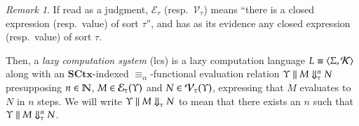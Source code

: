 \documentclass[11pt]{article}
\theoremstyle{definition}
\theoremstyle{remark}
\newtheorem{remark}[thm]{Remark}
\numberwithin{equation}{section}
\def\IModeColorName{MidnightBlue}
\def\OModeColorName{Maroon}
\def\IModeColorName{Black}
\def\OModeColorName{Black}
\newcommand\IMode[1]{{\color{\IModeColorName}{#1}}}
\newcommand\OMode[1]{{\color{\OModeColorName}{#1}}}
\newcommand\Member[2]{\IMode{#1}\in\IMode{#2}}
\newcommand\Match[2]{\IMode{#1}\equiv\OMode{#2}}
\newcommand\CanOperators{\mathcal{K}}
\newcommand\SCtx{\mathbf{SCtx}}
\newcommand\Pair[2]{\left\langle#1, #2 \right\rangle}
\newcommand\EvalN[5]{\IMode{#1}\parallel\IMode{#4}\Downarrow^{\OMode{#3}}_{\IMode{#2}}\OMode{#5}}
\newcommand\Eval[4]{\EvalN{#1}{#2}{}{#3}{#4}}
\newcommand\Exprs{\mathcal{E}}
\newcommand\Values{\mathcal{V}}
\newcommand\Naturals{\mathbb{N}}
\begin{document}
\begin{remark}
  If read as a judgment, $\Exprs_\tau$ (resp.\ $\Values_\tau$) means ``there is
  a closed expression (resp.\ value) of sort $\tau$'', and has as its evidence any closed
  expression (resp.\ value) of sort $\tau$.
\end{remark}

Then, a \emph{lazy computation system} (lcs) is a lazy computation language
$\Match{L}{\Pair{\Sigma}{\CanOperators}}$ along with an $\SCtx$-indexed
$\equiv_\alpha$-functional evaluation relation
$\EvalN{\Upsilon}{\tau}{n}{M}{N}$ presupposing $\Member{n}{\Naturals}$,
$\Member{M}{\Exprs_\tau(\Upsilon)}$ and $\Member{N}{\Values_\tau(\Upsilon)}$,
expressing that $M$ evaluates to $N$ in $n$ steps.  We will write
$\Eval{\Upsilon}{\tau}{M}{N}$ to mean that there exists an $n$ such that
$\EvalN{\Upsilon}{\tau}{n}{M}{N}$.

\ifdraft{}{
  \nocite{maclane:1971}
  
  
}
\end{document}
